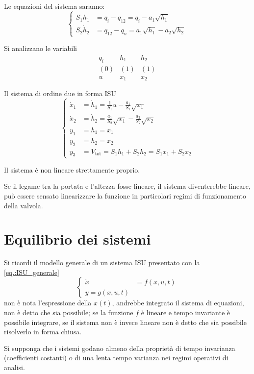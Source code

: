 Le equazioni del sistema saranno:
$$\left\{\begin{aligned}
S_1\dot h_1 &= q_i - q_{12} = q_i - a_1\sqrt{h_1} \\
S_2 \dot h_2 &= q_{12} - q_u = a_1\sqrt{h_1} - a_2\sqrt{h_2}
\end{aligned}\right.$$

Si analizzano le variabili
$$\begin{matrix}
q_i & h_1 & h_2 \\
(0) & (1) & (1) \\
u & x_1 & x_2
\end{matrix}$$

Il sistema di ordine due in forma ISU
$$\left\{\begin{aligned}
\dot x_1 &= \dot h_1 = \frac{1}{S_1} u - \frac{a_1}{S_1} \sqrt{x_1} \\
\dot x_2 &= \dot h_2 = \frac{a_1}{S_2}\sqrt{x_1} - \frac{a_2}{S_2} \sqrt{x_2} \\
y_1 &= h_1 = x_1 \\
y_2 &= h_2 =x_2 \\
y_3 &= V_{\text{tot}} = S_1h_1 + S_2h_2 = S_1x_1 + S_2 x_2
\end{aligned}\right.$$

Il sistema è non lineare strettamente proprio.

Se il legame tra la portata e l'altezza fosse lineare, il sistema diventerebbe
lineare, può essere sensato linearizzare la funzione in particolari regimi di
funzionamento della valvola.


\chapter{Equilibrio dei sistemi}
Si ricordi il modello generale di un sistema ISU presentato con la
\ref{eq.:ISU_generale}
$$
\left\{\begin{aligned}
\dot x & = f(x,u,t) \\
y = g(x,u,t)
\end{aligned}\right.
$$
non è nota l'espressione della $x(t)$, andrebbe
integrato il sistema di equazioni, non è detto che sia possibile; se la
funzione $f$ è lineare e tempo invariante è possibile integrare, se il sistema
non è invece lineare non è detto che sia possibile risolverlo in forma chiusa.

Si supponga che i sistemi godano almeno della proprietà di tempo invarianza
(coefficienti costanti) o di una lenta tempo varianza nei regimi operativi di
analisi.

